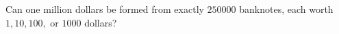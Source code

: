 Can one million dollars be formed from exactly $250000$ banknotes, each worth $1,10,100,$ or $1000$ dollars?
